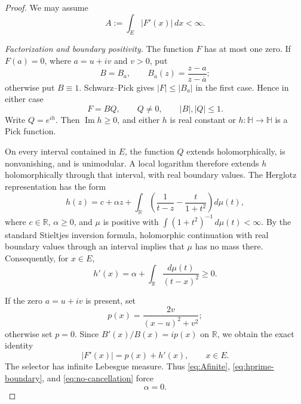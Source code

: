 \documentclass[11pt]{article}
\theoremstyle{remark}
\newcommand{\Hh}{\mathbb H}
\newcommand{\R}{\mathbb R}
\begin{document}
\begin{proof}
We may assume
\begin{equation}\label{eq:Afinite}
  A:=\int_E|F'(x)|\,dx<\infty.
\end{equation}

\smallskip
\noindent\emph{Factorization and boundary positivity.}
The function $F$ has at most one zero. If $F(a)=0$, where $a=u+iv$ and
$v>0$, put
\[
  B=B_a,\qquad B_a(z)=\frac{z-a}{z-\overline a};
\]
otherwise put $B\equiv1$. Schwarz--Pick gives $|F|\le|B_a|$ in the first
case. Hence in either case
\begin{equation}\label{eq:FBQ}
  F=BQ,
  \qquad Q\ne0,
  \qquad |B|,|Q|\le1.
\end{equation}
Write $Q=e^{ih}$. Then $\operatorname{Im}h\ge0$, and either $h$ is real
constant or $h:\Hh\to\Hh$ is a Pick function.

On every interval contained in $E$, the function $Q$ extends holomorphically,
is nonvanishing, and is unimodular. A local logarithm therefore extends $h$
holomorphically through that interval, with real boundary values. The Herglotz representation \cite[Chapter~I]{Duren} has the form
\begin{equation}\label{eq:Herglotz}
  h(z)=c+\alpha z+
  \int_{\R}\left(\frac1{t-z}-\frac{t}{1+t^2}\right)d\mu(t),
\end{equation}
where $c\in\R$, $\alpha\ge0$, and $\mu$ is positive with
$\int(1+t^2)^{-1}\,d\mu(t)<\infty$. By the standard Stieltjes inversion
formula, holomorphic continuation with real boundary values through an
interval implies that $\mu$ has no mass there. Consequently, for $x\in E$,
\begin{equation}\label{eq:hprime-boundary}
  h'(x)=\alpha+\int_{\R}\frac{d\mu(t)}{(t-x)^2}\ge0.
\end{equation}

If the zero $a=u+iv$ is present, set
\[
  p(x)=\frac{2v}{(x-u)^2+v^2};
\]
otherwise set $p=0$. Since $B'(x)/B(x)=ip(x)$ on $\R$, we obtain the exact
identity
\begin{equation}\label{eq:no-cancellation}
  |F'(x)|=p(x)+h'(x),
  \qquad x\in E.
\end{equation}
The selector has infinite Lebesgue measure. Thus \eqref{eq:Afinite},
\eqref{eq:hprime-boundary}, and \eqref{eq:no-cancellation} force
\begin{equation}\label{eq:alpha-zero}
  \alpha=0.
\end{equation}


\end{proof}
\end{document}
